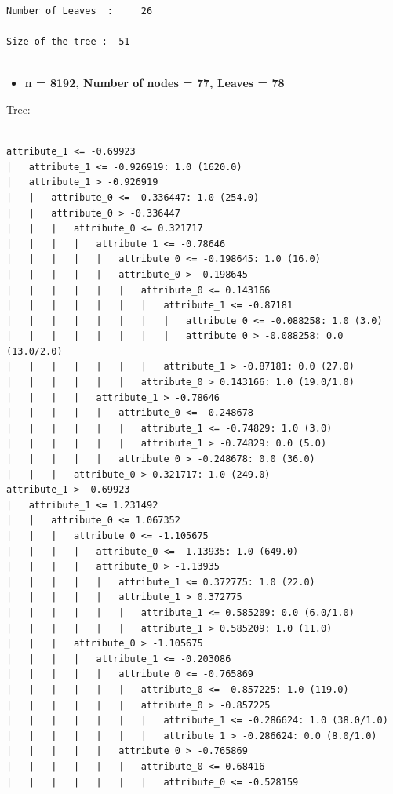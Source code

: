 \documentclass[a4paper]{article}
\theoremstyle{definition}
\newenvironment{soln}{
    \leavevmode\color{blue}\ignorespaces
}{}
\begin{document}
\begin{soln}
\begin{lstlisting}
Number of Leaves  : 	26

Size of the tree : 	51


\end{lstlisting}

\vspace{1cm}

\begin{itemize}
	\item \textbf{n = 8192, Number of nodes = 77, Leaves = 78}
\end{itemize}
Tree:


\begin{lstlisting}

attribute_1 <= -0.69923
|   attribute_1 <= -0.926919: 1.0 (1620.0)
|   attribute_1 > -0.926919
|   |   attribute_0 <= -0.336447: 1.0 (254.0)
|   |   attribute_0 > -0.336447
|   |   |   attribute_0 <= 0.321717
|   |   |   |   attribute_1 <= -0.78646
|   |   |   |   |   attribute_0 <= -0.198645: 1.0 (16.0)
|   |   |   |   |   attribute_0 > -0.198645
|   |   |   |   |   |   attribute_0 <= 0.143166
|   |   |   |   |   |   |   attribute_1 <= -0.87181
|   |   |   |   |   |   |   |   attribute_0 <= -0.088258: 1.0 (3.0)
|   |   |   |   |   |   |   |   attribute_0 > -0.088258: 0.0 (13.0/2.0)
|   |   |   |   |   |   |   attribute_1 > -0.87181: 0.0 (27.0)
|   |   |   |   |   |   attribute_0 > 0.143166: 1.0 (19.0/1.0)
|   |   |   |   attribute_1 > -0.78646
|   |   |   |   |   attribute_0 <= -0.248678
|   |   |   |   |   |   attribute_1 <= -0.74829: 1.0 (3.0)
|   |   |   |   |   |   attribute_1 > -0.74829: 0.0 (5.0)
|   |   |   |   |   attribute_0 > -0.248678: 0.0 (36.0)
|   |   |   attribute_0 > 0.321717: 1.0 (249.0)
attribute_1 > -0.69923
|   attribute_1 <= 1.231492
|   |   attribute_0 <= 1.067352
|   |   |   attribute_0 <= -1.105675
|   |   |   |   attribute_0 <= -1.13935: 1.0 (649.0)
|   |   |   |   attribute_0 > -1.13935
|   |   |   |   |   attribute_1 <= 0.372775: 1.0 (22.0)
|   |   |   |   |   attribute_1 > 0.372775
|   |   |   |   |   |   attribute_1 <= 0.585209: 0.0 (6.0/1.0)
|   |   |   |   |   |   attribute_1 > 0.585209: 1.0 (11.0)
|   |   |   attribute_0 > -1.105675
|   |   |   |   attribute_1 <= -0.203086
|   |   |   |   |   attribute_0 <= -0.765869
|   |   |   |   |   |   attribute_0 <= -0.857225: 1.0 (119.0)
|   |   |   |   |   |   attribute_0 > -0.857225
|   |   |   |   |   |   |   attribute_1 <= -0.286624: 1.0 (38.0/1.0)
|   |   |   |   |   |   |   attribute_1 > -0.286624: 0.0 (8.0/1.0)
|   |   |   |   |   attribute_0 > -0.765869
|   |   |   |   |   |   attribute_0 <= 0.68416
|   |   |   |   |   |   |   attribute_0 <= -0.528159

\end{lstlisting}
\end{soln}
\end{document}
